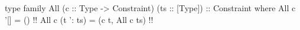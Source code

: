 \begin{code}
type family All (c :: Type -> Constraint)
                (ts :: [Type]) :: Constraint where
  All c '[]       = ()  !!
  All c (t ': ts) = (c t, All c ts)  !!
\end{code}
